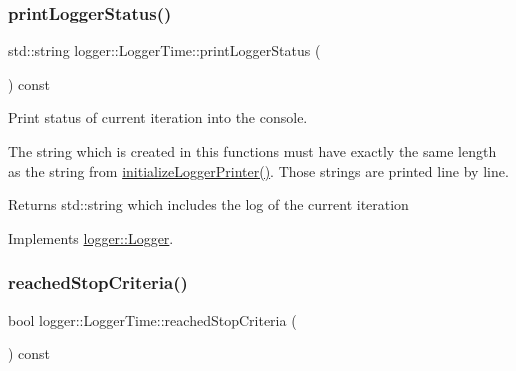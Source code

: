 \mbox{\label{classlogger_1_1_logger_time_a22bef2a992b88689d7748c4017e17d19}} 
\subsubsection{\texorpdfstring{print\+Logger\+Status()}{printLoggerStatus()}}
{\footnotesize\ttfamily std\+::string logger\+::\+Logger\+Time\+::print\+Logger\+Status (\begin{DoxyParamCaption}{ }\end{DoxyParamCaption}) const\hspace{0.3cm}{\ttfamily [virtual]}}



Print status of current iteration into the console. 

The string which is created in this functions must have exactly the same length as the string from {\ttfamily \mbox{\hyperlink{classlogger_1_1_logger_time_a3b3c55f2ff14363a93f9ac0a2e23e1df}{initialize\+Logger\+Printer()}}}. Those strings are printed line by line.

\begin{DoxyReturn}{Returns}
{\ttfamily std\+::string} which includes the log of the current iteration 
\end{DoxyReturn}


Implements \mbox{\hyperlink{classlogger_1_1_logger_abad818a7e8053ca84cb267e883b5e377}{logger\+::\+Logger}}.

\mbox{\label{classlogger_1_1_logger_time_a727f16a2deed4d64293844615f18df08}} 
\subsubsection{\texorpdfstring{reached\+Stop\+Criteria()}{reachedStopCriteria()}}
{\footnotesize\ttfamily bool logger\+::\+Logger\+Time\+::reached\+Stop\+Criteria (\begin{DoxyParamCaption}{ }\end{DoxyParamCaption}) const\hspace{0.3cm}{\ttfamily [virtual]}}



